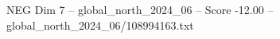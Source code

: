 \begin{textsample}{NEG Dim 7 – global\_north\_2024\_06 – Score -12.00 – global\_north\_2024\_06/108994163.txt}
\end{textsample}
